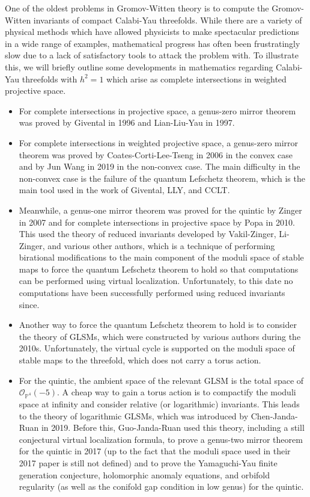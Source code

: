 \documentclass[10pt]{amsart}
\theoremstyle{definition}
\theoremstyle{remark}
\theoremstyle{plain}
\theoremstyle{definition}
\theoremstyle{remark}
\renewcommand{\P}{\mathbb{P}}
\newcommand{\mc}[1]{\mathcal{#1}}
\newcommand{\1}{\mathbf{1}}
\newcommand{\2}{\mathbf{2}}
\newcommand{\3}{\mathbf{3}}
\begin{document}
One of the oldest problems in Gromov-Witten theory is to compute the Gromov-Witten invariants of compact Calabi-Yau threefolds. While there are a variety of physical methods which have allowed physicists to make spectacular predictions in a wide range of examples, mathematical progress has often been frustratingly slow due to a lack of satisfactory tools to attack the problem with. To illustrate this, we will briefly outline some developments in mathematics regarding Calabi-Yau threefolds with $h^2 = 1$ which arise as complete intersections in weighted projective space.
\begin{itemize}
    \item For complete intersections in projective space, a genus-zero mirror theorem was proved by Givental in 1996 and Lian-Liu-Yau in 1997.
    \item For complete intersections in weighted projective space, a genus-zero mirror theorem was proved by Coates-Corti-Lee-Tseng in 2006 in the convex case and by Jun Wang in 2019 in the non-convex case. The main difficulty in the non-convex case is the failure of the quantum Lefschetz theorem, which is the main tool used in the work of Givental, LLY, and CCLT.
    \item Meanwhile, a genus-one mirror theorem was proved for the quintic by Zinger in 2007 and for complete intersections in projective space by Popa in 2010. This used the theory of reduced invariants developed by Vakil-Zinger, Li-Zinger, and various other authors, which is a technique of performing birational modifications to the main component of the moduli space of stable maps to force the quantum Lefschetz theorem to hold so that computations can be performed using virtual localization. Unfortunately, to this date no computations have been successfully performed using reduced invariants since.
    \item Another way to force the quantum Lefschetz theorem to hold is to consider the theory of GLSMs, which were constructed by various authors during the 2010s. Unfortunately, the virtual cycle is supported on the moduli space of stable maps to the threefold, which does not carry a torus action.
    \item For the quintic, the ambient space of the relevant GLSM is the total space of $\mc{O}_{\P^4}(-5)$. A cheap way to gain a torus action is to compactify the moduli space at infinity and consider relative (or logarithmic) invariants. This leads to the theory of logarithmic GLSMs, which was introduced by Chen-Janda-Ruan in 2019. Before this, Guo-Janda-Ruan used this theory, including a still conjectural virtual localization formula, to prove a genus-two mirror theorem for the quintic in 2017 (up to the fact that the moduli space used in their 2017 paper is still not defined) and to prove the Yamaguchi-Yau finite generation conjecture, holomorphic anomaly equations, and orbifold regularity (as well as the conifold gap condition in low genus) for the quintic.

\end{itemize}
\end{document}
